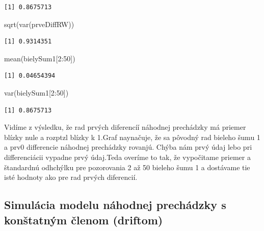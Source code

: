 \documentclass[
  letterpaper,
  DIV=11,
  numbers=noendperiod]{scrreprt}
\newenvironment{Shaded}{\begin{snugshade}}{\end{snugshade}}
\newcommand{\DecValTok}[1]{\textcolor[rgb]{0.68,0.00,0.00}{#1}}
\newcommand{\FunctionTok}[1]{\textcolor[rgb]{0.28,0.35,0.67}{#1}}
\newcommand{\NormalTok}[1]{\textcolor[rgb]{0.00,0.23,0.31}{#1}}
\newcommand{\SpecialCharTok}[1]{\textcolor[rgb]{0.37,0.37,0.37}{#1}}
\begin{document}
\begin{verbatim}
[1] 0.8675713
\end{verbatim}

\begin{Shaded}
\begin{Highlighting}[]
\FunctionTok{sqrt}\NormalTok{(}\FunctionTok{var}\NormalTok{(prveDiffRW))}
\end{Highlighting}
\end{Shaded}

\begin{verbatim}
[1] 0.9314351
\end{verbatim}

\begin{Shaded}
\begin{Highlighting}[]
\FunctionTok{mean}\NormalTok{(bielySum1[}\DecValTok{2}\SpecialCharTok{:}\DecValTok{50}\NormalTok{])}
\end{Highlighting}
\end{Shaded}

\begin{verbatim}
[1] 0.04654394
\end{verbatim}

\begin{Shaded}
\begin{Highlighting}[]
\FunctionTok{var}\NormalTok{(bielySum1[}\DecValTok{2}\SpecialCharTok{:}\DecValTok{50}\NormalTok{])}
\end{Highlighting}
\end{Shaded}

\begin{verbatim}
[1] 0.8675713
\end{verbatim}

Vidíme z výsledku, že rad prvých diferencíí náhodnej prechádzky má
priemer blízky nule a rozptzl blízky k 1.Graf naynačuje, že sa pôvodný
rad bieleho šumu 1 a prv0 differencie náhodnej prechádzky rovanjú. Chýba
nám prvý údaj lebo pri differenciácii vypadne prvý údaj.Teda overíme to
tak, že vypočitame priemer a štandardnú odhchýlku pre pozorovania 2 až
50 bieleho šumu 1 a dostávame tie isté hodnoty ako pre rad prvých
diferencií.

\subsection{Simulácia modelu náhodnej prechádzky s konštatným členom
(driftom)}\label{simuluxe1cia-modelu-nuxe1hodnej-prechuxe1dzky-s-konux161tatnuxfdm-ux10dlenom-driftom}
\end{document}
